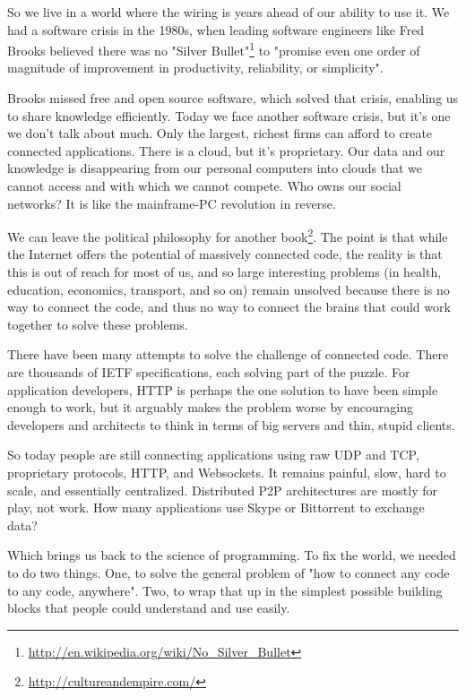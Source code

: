 So we live in a world where the wiring is years ahead of our ability to use it.
We had a software crisis in the 1980s, when leading software engineers like
Fred Brooks believed there was no "Silver
Bullet"\footnote{\url{http://en.wikipedia.org/wiki/No_Silver_Bullet}} to
"promise even one order of magnitude of improvement in productivity,
reliability, or simplicity".

Brooks missed free and open source software, which solved that crisis, enabling
us to share knowledge efficiently. Today we face another software crisis, but
it's one we don't talk about much. Only the largest, richest firms can afford
to create connected applications. There is a cloud, but it's proprietary. Our
data and our knowledge is disappearing from our personal computers into clouds
that we cannot access and with which we cannot compete. Who owns our social
networks? It is like the mainframe-PC revolution in reverse.

We can leave the political philosophy for another
book\footnote{\url{http://cultureandempire.com/}}. The point is that while the
Internet offers the potential of massively connected code, the reality is that
this is out of reach for most of us, and so large interesting problems (in
health, education, economics, transport, and so on) remain unsolved because
there is no way to connect the code, and thus no way to connect the brains that
could work together to solve these problems.

There have been many attempts to solve the challenge of connected code. There
are thousands of IETF specifications, each solving part of the puzzle. For
application developers, HTTP is perhaps the one solution to have been simple
enough to work, but it arguably makes the problem worse by encouraging
developers and architects to think in terms of big servers and thin, stupid
clients.

So today people are still connecting applications using raw UDP and TCP,
proprietary protocols, HTTP, and Websockets. It remains painful, slow, hard to
scale, and essentially centralized. Distributed P2P architectures are mostly
for play, not work. How many applications use Skype or Bittorrent to exchange
    data?

Which brings us back to the science of programming. To fix the world, we needed
to do two things. One, to solve the general problem of "how to connect any code
to any code, anywhere". Two, to wrap that up in the simplest possible building
blocks that people could understand and use easily.

